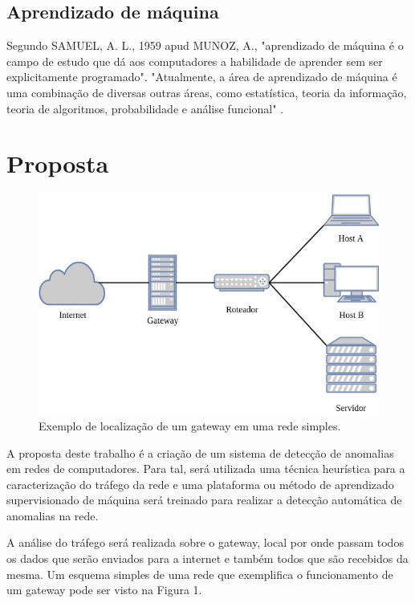 \documentclass[openright]{normas-utf-tex} %
\begin{document}
\section{Aprendizado de máquina}

Segundo SAMUEL, A. L., 1959  apud MUNOZ, A., "aprendizado de máquina é o campo de estudo que dá aos computadores a habilidade de aprender sem ser explicitamente programado". "Atualmente, a área de aprendizado de máquina é uma combinação de diversas outras áreas, como estatística, teoria da informação, teoria de algoritmos, probabilidade e análise funcional" \cite{munoz}.

\chapter{Proposta}
\renewcommand\thefigure{1}
\setcounter{figure}{1}
\begin{figure}[!htb]
	\centering
	\includegraphics[width=1\textwidth]{./gateway.jpg}
	\caption{Exemplo de localização de um gateway em uma rede simples.}
	\label{fig:gateway}
\end{figure}

A proposta deste trabalho é a criação de um sistema de detecção de anomalias em redes de computadores. Para tal, será utilizada uma técnica heurística para a caracterização do tráfego da rede e uma plataforma ou método de aprendizado supervisionado de máquina será treinado para realizar a detecção automática de anomalias na rede.

	A análise do tráfego será realizada sobre o gateway, local por onde passam todos os dados que serão enviados para a internet e também todos que são recebidos da mesma. Um esquema simples de uma rede que exemplifica o funcionamento de um gateway pode ser visto na Figura 1.
\end{document}
